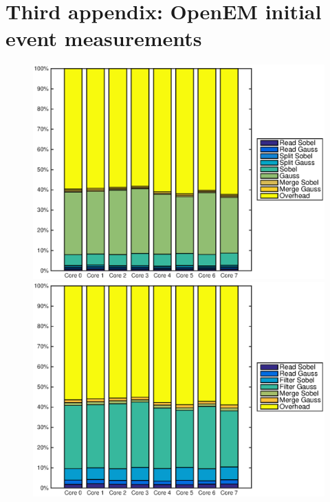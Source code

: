 \chapter{Third appendix: OpenEM initial event measurements }
\label{chapter:first-appendix}
\begin{figure}
    \centering
    \begin{minipage}{0.45\textwidth}
        \centering
        \includegraphics[width=0.99\linewidth]{images/openem_cifcif_2initial_func.eps}
    \end{minipage}
    \hfill
    \begin{minipage}{0.45\textwidth}
        \centering
        \includegraphics[width=0.99\linewidth]{images/openem_cifcif_2initial_eo.eps}
    \end{minipage}%
\end{figure}
